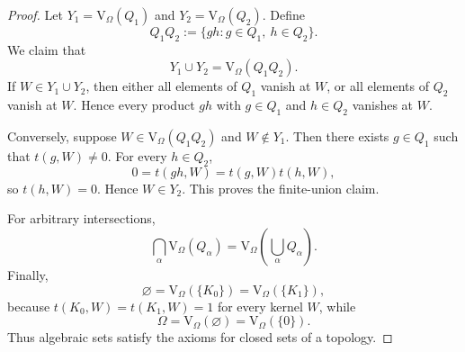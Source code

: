 \documentclass[10pt,a4paper]{amsart}
\newcommand\V{\mathrm{V}_{\Omega}}
\begin{document}
\begin{proof}
Let $Y_1=\V(Q_1)$ and $Y_2=\V(Q_2)$. Define
\[
    Q_1Q_2:=\{gh:g\in Q_1,\ h\in Q_2\}.
\]
We claim that
\[
    Y_1\cup Y_2=\V(Q_1Q_2).
\]
If $W\in Y_1\cup Y_2$, then either all elements of $Q_1$ vanish at $W$, or all elements of $Q_2$ vanish at $W$. Hence every product $gh$ with $g\in Q_1$ and $h\in Q_2$ vanishes at $W$.

Conversely, suppose $W\in\V(Q_1Q_2)$ and $W\notin Y_1$. Then there exists $g\in Q_1$ such that $t(g,W)\neq0$. For every $h\in Q_2$,
\[
    0=t(gh,W)=t(g,W)t(h,W),
\]
so $t(h,W)=0$. Hence $W\in Y_2$. This proves the finite-union claim.

For arbitrary intersections,
\[
    \bigcap_{\alpha}\V(Q_\alpha)=\V\!\left(\bigcup_{\alpha}Q_\alpha\right).
\]
Finally,
\[
    \varnothing=\V(\{K_0\})=\V(\{K_1\}),
\]
because $t(K_0,W)=t(K_1,W)=1$ for every kernel $W$, while
\[
    \Omega=\V(\varnothing)=\V(\{0\}).
\]
Thus algebraic sets satisfy the axioms for closed sets of a topology.
\end{proof}
\end{document}
